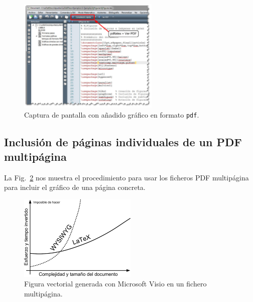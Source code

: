 \documentclass[11pt,a4paper]{article}
\begin{document}
\begin{figure}[hbt]
	\centering
	\includegraphics[width=0.6\textwidth]{texmk03} 
	\caption[Captura con gráfico en \texttt{pdf}]{Captura de pantalla con añadido gráfico en formato \texttt{pdf}.}
	\label{fig:texmk03}
\end{figure}









\subsection{Inclusión de páginas individuales de un \textsf{PDF} multipágina}
La Fig.~\ref{fig:visio_mp} nos muestra el procedimiento para usar los ficheros \textsf{PDF} multipágina para incluir el gráfico de una página concreta.

\begin{figure}[hbt]
	\centering
	\includegraphics[page=2,width=0.5\textwidth]{visio_mp} 
	\caption[Gráfico de Visio multipágina]{Figura vectorial generada con Microsoft Visio en un fichero multipágina.}
	\label{fig:visio_mp}
\end{figure}
\end{document}
